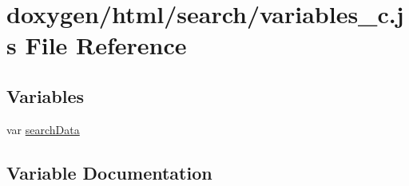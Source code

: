 \hypertarget{a00116}{}\section{doxygen/html/search/variables\+\_\+c.js File Reference}
\label{a00116}
\subsection*{Variables}
\begin{DoxyCompactItemize}
\item 
var \hyperlink{a00116_ad01a7523f103d6242ef9b0451861231e}{search\+Data}
\end{DoxyCompactItemize}


\subsection{Variable Documentation}
\hypertarget{a00116_ad01a7523f103d6242ef9b0451861231e}{}
